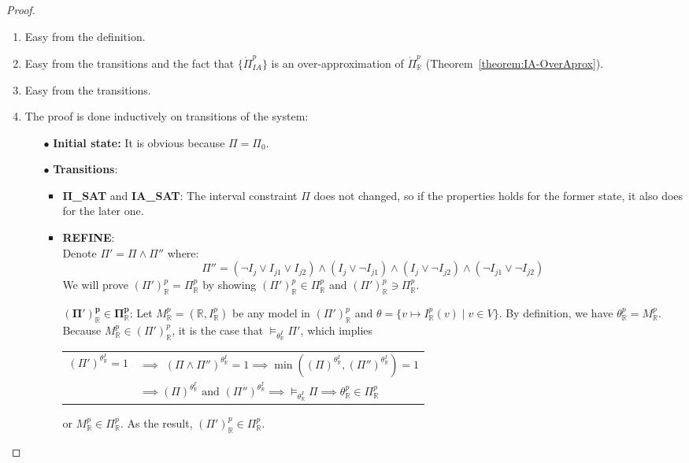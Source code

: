 \begin{proof}   
\begin{enumerate}
\item Easy from the definition.
\item Easy from the transitions and the fact that $\{\mathring{\Pi}^p_{IA}\}$ is an over-approximation of $\mathring{\Pi}^p_\mathbb{R}$ (Theorem~\ref{theorem:IA-OverAprox}).
\item Easy from the transitions.
\item The proof is done inductively on transitions of the system:
\begin{itemize}
\item[$\bullet$] \sloppy \textbf{Initial state:} It is obvious because $\Pi = \Pi_0$.
\item[$\bullet$] \textbf{Transitions}:
\begin{itemize}
\item \textbf{$\pmb\Pi$\_SAT} and \textbf{IA\_SAT}: The interval constraint $\Pi$ does not changed, so if the properties holds for the former state, it also does for the later one.
\item \sloppy \textbf{REFINE}: \\ Denote ${\Pi' = \Pi \wedge \Pi''}$ where: \[\Pi'' = (\neg I_j \vee I_{j1} \vee I_{j2}) \wedge (I_j \vee \neg I_{j1}) \wedge (I_j \vee \neg I_{j2}) \wedge (\neg I_{j1} \vee \neg I_{j2})\] We will prove $(\Pi')^p_\mathbb{R} = \Pi^p_\mathbb{R}$ by showing $(\Pi')^p_\mathbb{R} \in \Pi^p_\mathbb{R}$ and $(\Pi')^p_\mathbb{R} \ni \Pi^p_\mathbb{R}$.

$\pmb{(\Pi')^p_\mathbb{R} \in \Pi^p_\mathbb{R}}$: Let $M^p_\mathbb{R}=(\mathbb{R}, I^p_\mathbb{R})$ be any model in $(\Pi')^p_\mathbb{R}$ and ${\theta = \{v \mapsto I^p_\mathbb{R}(v) \mid v \in V\}}$. By definition, we have $\theta^p_\mathbb{R}=M^p_\mathbb{R}$. Because $M^p_\mathbb{R} \in (\Pi')^p_\mathbb{R}$, it is the case that $\models_{\theta^I_\mathbb{R}} \Pi'$, which implies
\begin{tabular} {l l}
$(\Pi')^{\theta^I_\mathbb{R}} = 1$ &$\implies$ $(\Pi \wedge \Pi'' )^{\theta^I_\mathbb{R}} = 1 \implies \min((\Pi)^{\theta^I_\mathbb{R}}, (\Pi'')^{\theta^I_\mathbb{R}}) = 1$ \\
&$\implies (\Pi)^{\theta^I_\mathbb{R}} \text{ and } (\Pi'')^{\theta^I_\mathbb{R}} \implies \models_{\theta^I_\mathbb{R}} \Pi \implies \theta^p_\mathbb{R} \in \Pi^p_\mathbb{R}$
\end{tabular}

or $M^p_\mathbb{R} \in \Pi^p_\mathbb{R}$. As the result, $(\Pi')^p_\mathbb{R} \in \Pi^p_\mathbb{R}$.


\end{itemize}
\end{itemize}
\end{enumerate}
\end{proof}

